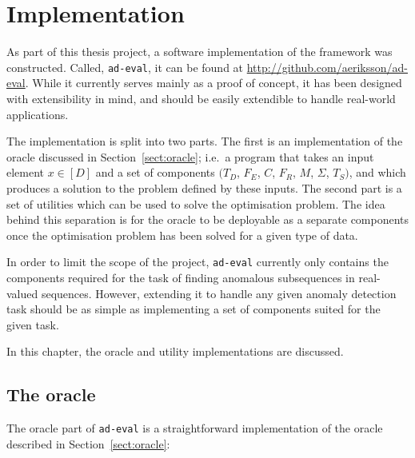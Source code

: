 \chapter{Implementation}
\label{ch:implementation}

As part of this thesis project, a software implementation of the framework was constructed. Called, \texttt{ad-eval}, it can be found at \url{http://github.com/aeriksson/ad-eval}. While it currently serves mainly as a proof of concept, it has been designed with extensibility in mind, and should be easily extendible to handle real-world applications.

The implementation is split into two parts. The first is an implementation of the oracle discussed in Section~\ref{sect:oracle}; i.e.\ a program that takes an input element $x \in [D]$ and a set of components $(T_D$, $F_E$, $C$, $F_R$, $M$, $\Sigma$, $T_S)$, and which produces a solution to the problem defined by these inputs. The second part is a set of utilities which can be used to solve the optimisation problem. The idea behind this separation is for the oracle to be deployable as a separate components once the optimisation problem has been solved for a given type of data.

In order to limit the scope of the project, \texttt{ad-eval} currently only contains the components required for the task of finding anomalous subsequences in real-valued sequences. However, extending it to handle any given anomaly detection task should be as simple as implementing a set of components suited for the given task.

In this chapter, the oracle and utility implementations are discussed.

\section{The oracle}

The oracle part of \texttt{ad-eval} is a straightforward implementation of the oracle described in Section~\ref{sect:oracle}:

\begin{algorithmic}
     
    \EndFor{}
\end{algorithmic}

